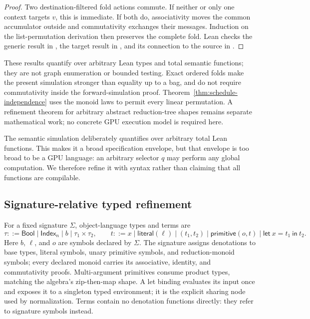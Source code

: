 \begin{proof}
Two destination-filtered fold actions commute.  If neither or only one context
targets $v$, this is immediate.  If both do, associativity moves the common
accumulator outside and commutativity exchanges their messages.  Induction on
the list-permutation derivation then preserves the complete fold.  Lean checks
the generic result in , the target result in
, and its connection to the source in
.
\end{proof}

These results quantify over arbitrary Lean types and total semantic functions;
they are not graph enumeration or bounded testing.  Exact ordered folds make
the present simulation stronger than equality up to a bag, and do not require
commutativity inside the forward-simulation proof.  Theorem~\ref{thm:schedule-independence}
uses the monoid laws to permit every linear permutation.  A refinement theorem
for arbitrary abstract reduction-tree shapes remains separate mathematical
work; no concrete GPU execution model is required here.

The semantic simulation deliberately quantifies over arbitrary total Lean
functions.  This makes it a broad specification envelope, but that envelope is
too broad to be a GPU language: an arbitrary selector $q$ may perform any
global computation.  We therefore refine it with syntax rather than claiming
that all functions are compilable.

\subsection{Signature-relative typed refinement}

\begin{definition}
For a fixed signature $\Sigma$, object-language types and terms are
\[
 \tau ::= \mathsf{Bool}\mid\mathsf{Index}_n\mid b
          \mid \tau_1\times\tau_2,
 \qquad
 t ::= x\mid\mathsf{literal}(\ell)\mid(t_1,t_2)
          \mid\mathsf{primitive}(o,t)
          \mid\mathsf{let}\ x=t_1\ \mathsf{in}\ t_2.
\]
Here $b$, $\ell$, and $o$ are symbols declared by $\Sigma$.  The signature
assigns denotations to base types, literal symbols, unary primitive symbols,
and reduction-monoid symbols; every declared monoid carries its associative,
identity, and commutativity proofs.  Multi-argument primitives consume product
types, matching the algebra's zip-then-map shape.  A let binding evaluates its
input once and exposes it to a singleton typed environment; it is the explicit
sharing node used by normalization.  Terms contain no denotation functions
directly: they refer to signature symbols instead.
\end{definition}

